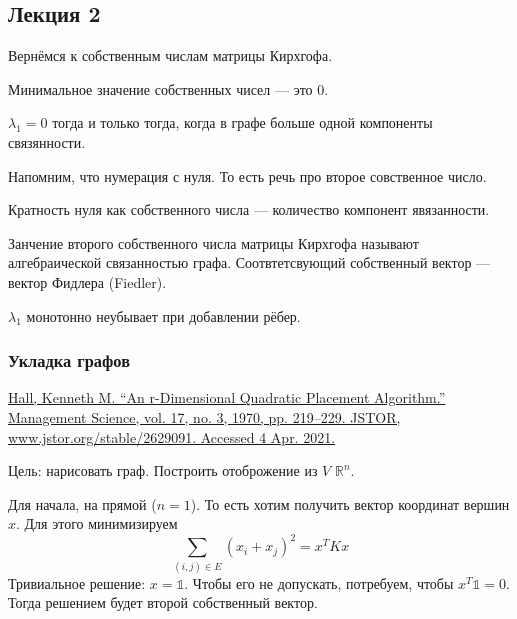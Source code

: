 \subsection{Лекция 2}

Вернёмся к собственным числам матрицы Кирхгофа. 

Минимальное значение собственных чисел --- это 0.

\begin{theorem}
$\lambda_1 = 0 $ тогда и только тогда, когда в графе больше одной компоненты связянности. 
\end{theorem}

Напомним, что нумерация с нуля. То есть речь про второе совственное число.

Кратность нуля как собственного числа --- количество компонент явязанности.

\begin{definition}
Занчение второго собственного числа матрицы Кирхгофа называют алгебраической связанностью графа.
Соотвтетсвующий собственный вектор --- вектор Фидлера (Fiedler).
\end{definition}

$\lambda_1$ монотонно неубывает при добавлении рёбер.

\subsubsection{Укладка графов}

\href{https://www.jstor.org/stable/2629091?seq=1}{Hall, Kenneth M. “An r-Dimensional Quadratic Placement Algorithm.” Management Science, vol. 17, no. 3, 1970, pp. 219–229. JSTOR, www.jstor.org/stable/2629091. Accessed 4 Apr. 2021.}

Цель: нарисовать граф. Построить отоброжение из $V$ $\mathbb{R}^n$.

Для начала, на прямой ($n=1$). То есть хотим получить вектор координат вершин $x$. 
Для этого минимизируем $$\sum_{(i,j) \in E} (x_i + x_j)^2 = x^T K x$$
Тривиальное решение: $x = \mathbb{1}$. 
Чтобы его не допускать, потребуем, чтобы $x^T\mathbb{1} = 0$.
Тогда решением будет второй собственный вектор.


 \begin{center}
  \end{center}

